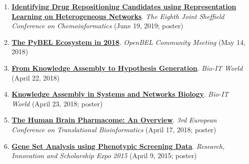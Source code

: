 \documentclass[10pt,a4paper,sans]{moderncv} %
\begin{document}
\begin{enumerate}
    \item \textbf{\href{https://doi.org/10.6084/m9.figshare.8288822.v2}{Identifying Drug Repositioning Candidates using Representation Learning on Heterogeneous Networks}}. \textit{The Eighth Joint Sheffield Conference on Chemoinformatics} (June 19, 2019; poster)

    \item \textbf{\href{https://docs.google.com/presentation/d/1Gsk8LxrVgrICproSgWZ3Gk4BXyOg-UwFlfzhVw5O0t8/edit?usp=sharing}{The PyBEL Ecosystem in 2018}}. \textit{OpenBEL Community Meeting} (May 14, 2018)

    \item \textbf{\href{https://docs.google.com/presentation/d/1_3j8H4f9pQ1m2ZQrF2QNfQNLh5SGqaodnl4AlaAST6w/edit?usp=sharing}{From Knowledge Assembly to Hypothesis Generation}}. \textit{Bio-IT World} (April 22, 2018)

    \item \textbf{\href{https://doi.org/10.6084/m9.figshare.6231701.v1}{Knowledge Assembly in Systems and Networks Biology}}. \textit{Bio-IT World} (April 23, 2018; poster)

    \item \textbf{\href{https://doi.org/10.6084/m9.figshare.6163775.v3}{The Human Brain Pharmacome: An Overview}}. \textit{3rd European Conference on Translational Bioinformatics} (April 17, 2018; poster)

    \item \textbf{\href{https://docs.google.com/presentation/d/1FU8lWGw6x4y9A_qB9rmxSaRRKiC0V3403EJETVGYMzk/edit?usp=sharing}{Gene Set Analysis using Phenotypic Screening Data}}. \textit{Research, Innovation and Scholarship Expo 2015} (April 9, 2015; poster)

\end{enumerate}
\end{document}
